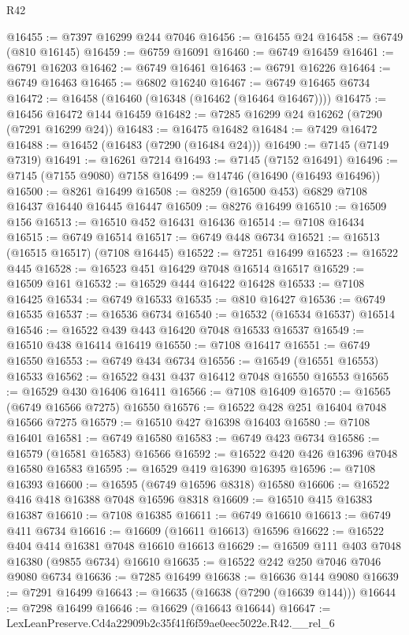 \begin{lexlean}{R42}
\begin{coremodule}
{@16455 := @7397 @16299 @244 @7046
@16456 := @16455 @24
@16458 := @6749 (@810 @16145)
@16459 := @6759 @16091
@16460 := @6749 @16459
@16461 := @6791 @16203
@16462 := @6749 @16461
@16463 := @6791 @16226
@16464 := @6749 @16463
@16465 := @6802 @16240
@16467 := @6749 @16465 @6734
@16472 := @16458 (@16460 (@16348 (@16462 (@16464 @16467))))
@16475 := @16456 @16472 @144 @16459
@16482 := @7285 @16299 @24 @16262 (@7290 (@7291 @16299 @24))
@16483 := @16475 @16482
@16484 := @7429 @16472
@16488 := @16452 (@16483 (@7290 (@16484 @24)))
@16490 := @7145 (@7149 @7319)
@16491 := @16261 @7214
@16493 := @7145 (@7152 @16491)
@16496 := @7145 (@7155 @9080) @7158
@16499 := @14746 (@16490 (@16493 @16496))
@16500 := @8261 @16499
@16508 := @8259 (@16500 @453) @6829 @7108 @16437 @16440 @16445 @16447
@16509 := @8276 @16499
@16510 := @16509 @156
@16513 := @16510 @452 @16431 @16436
@16514 := @7108 @16434
@16515 := @6749 @16514
@16517 := @6749 @448 @6734
@16521 := @16513 (@16515 @16517) (@7108 @16445)
@16522 := @7251 @16499
@16523 := @16522 @445
@16528 := @16523 @451 @16429 @7048 @16514 @16517
@16529 := @16509 @161
@16532 := @16529 @444 @16422 @16428
@16533 := @7108 @16425
@16534 := @6749 @16533
@16535 := @810 @16427
@16536 := @6749 @16535
@16537 := @16536 @6734
@16540 := @16532 (@16534 @16537) @16514
@16546 := @16522 @439 @443 @16420 @7048 @16533 @16537
@16549 := @16510 @438 @16414 @16419
@16550 := @7108 @16417
@16551 := @6749 @16550
@16553 := @6749 @434 @6734
@16556 := @16549 (@16551 @16553) @16533
@16562 := @16522 @431 @437 @16412 @7048 @16550 @16553
@16565 := @16529 @430 @16406 @16411
@16566 := @7108 @16409
@16570 := @16565 (@6749 @16566 @7275) @16550
@16576 := @16522 @428 @251 @16404 @7048 @16566 @7275
@16579 := @16510 @427 @16398 @16403
@16580 := @7108 @16401
@16581 := @6749 @16580
@16583 := @6749 @423 @6734
@16586 := @16579 (@16581 @16583) @16566
@16592 := @16522 @420 @426 @16396 @7048 @16580 @16583
@16595 := @16529 @419 @16390 @16395
@16596 := @7108 @16393
@16600 := @16595 (@6749 @16596 @8318) @16580
@16606 := @16522 @416 @418 @16388 @7048 @16596 @8318
@16609 := @16510 @415 @16383 @16387
@16610 := @7108 @16385
@16611 := @6749 @16610
@16613 := @6749 @411 @6734
@16616 := @16609 (@16611 @16613) @16596
@16622 := @16522 @404 @414 @16381 @7048 @16610 @16613
@16629 := @16509 @111 @403 @7048 @16380 (@9855 @6734) @16610
@16635 := @16522 @242 @250 @7046 @7046 @9080 @6734
@16636 := @7285 @16499
@16638 := @16636 @144 @9080
@16639 := @7291 @16499
@16643 := @16635 (@16638 (@7290 (@16639 @144)))
@16644 := @7298 @16499
@16646 := @16629 (@16643 @16644)
@16647 := LexLeanPreserve.Cd4a22909b2c35f41f6f59ae0eec5022e.R42.__rel_6
}
\end{coremodule}
\end{lexlean}
